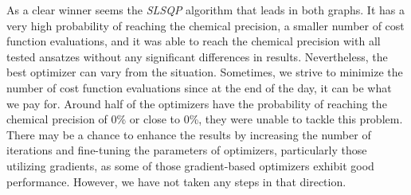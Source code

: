 As a clear winner seems the \textit{SLSQP} algorithm that leads in both graphs. It has a very high probability of reaching the chemical precision, a smaller number of cost function evaluations, and it was able to reach the chemical precision with all tested ansatzes without any significant differences in results. Nevertheless, the best optimizer can vary from the situation. Sometimes, we strive to minimize the number of cost function evaluations since at the end of the day, it can be what we pay for. Around half of the optimizers have the probability of reaching the chemical precision of 0\% or close to 0\%, they were unable to tackle this problem. There may be a chance to enhance the results by increasing the number of iterations and fine-tuning the parameters of optimizers, particularly those utilizing gradients, as some of those gradient-based optimizers exhibit good performance. However, we have not taken any steps in that direction.